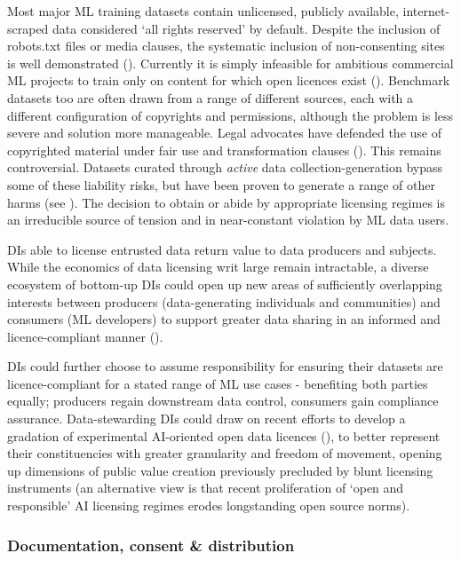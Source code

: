 Most major ML training datasets contain unlicensed, publicly available, internet-scraped data considered ‘all rights reserved’ by default. Despite the inclusion of robots.txt files or media clauses, the systematic inclusion of non-consenting sites is well demonstrated (\cite{khan2022SubjectsStagesAI}). Currently it is simply infeasible for ambitious commercial ML projects to train only on content for which open licences exist (\cite{chan2023ReclaimingDigitalCommons}). Benchmark datasets too are often drawn from a range of different sources, each with a different configuration of copyrights and permissions, although the problem is less severe and solution more manageable. Legal advocates have defended the use of copyrighted material under fair use and transformation clauses (\cite{sag2019NewLegalLandscape}). This remains controversial. Datasets curated through \textit{active} data collection-generation bypass some of these liability risks, but have been proven to generate a range of other harms (see \textcite{khan2022SubjectsStagesAI}). The decision to obtain or abide by appropriate licensing regimes is an irreducible source of tension and in near-constant violation by ML data users. 

DIs able to license entrusted data return value to data producers and subjects. While the economics of data licensing writ large remain intractable, a diverse ecosystem of bottom-up DIs could open up new areas of sufficiently overlapping interests between producers (data-generating individuals and communities) and consumers (ML developers) to support greater data sharing in an informed and licence-compliant manner (\cite{delacroix2019BottomupDataTrusts}). 

DIs could further choose to assume responsibility for ensuring their datasets are licence-compliant for a stated range of ML use cases - benefiting both parties equally; producers regain downstream data control, consumers gain compliance assurance. Data-stewarding DIs could draw on recent efforts to develop a gradation of experimental AI-oriented open data licences (\cite{dumas2023AI2ImpACTLicense}), to better represent their constituencies with greater granularity and freedom of movement, opening up dimensions of public value creation previously precluded by blunt licensing instruments (an alternative view is that recent proliferation of `open and responsible' AI licensing regimes erodes longstanding open source norms).

\subsubsection*{Documentation, consent \& distribution}

